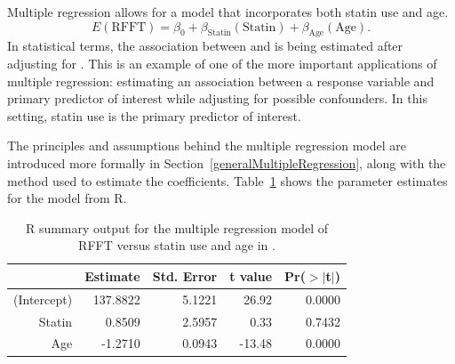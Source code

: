 Multiple regression allows for a model that incorporates both statin use and age.
 \[
    E(\text{RFFT}) = \beta_0 + \beta_{\text{Statin}}(\text{Statin}) + \beta_{\text{Age}}(\text{Age}).
	\label{RFFTStatinAgeEquation}
 \]
In statistical terms, the association between  and  is being estimated after adjusting for . This is an example of one of the more important applications of multiple regression: estimating an association between a response variable and primary predictor of interest while adjusting for possible confounders. In this setting, statin use is the primary predictor of interest.

The principles and assumptions behind the multiple regression model are introduced more formally in Section~\ref{generalMultipleRegression}, along with the method used to estimate the coefficients. Table~\ref{prevendRFFTStatinAgeRegression} shows the parameter estimates for the model from \textsf{R}. 
\begin{table}[ht]
\centering
\begin{tabular}{rrrrr}
  \hline
 & Estimate & Std. Error & t value & Pr($>$$|$t$|$) \\ 
  \hline
(Intercept) & 137.8822 & 5.1221 & 26.92 & 0.0000 \\ 
  Statin & 0.8509 & 2.5957 & 0.33 & 0.7432 \\ 
  Age & -1.2710 & 0.0943 & -13.48 & 0.0000 \\ 
   \hline
\end{tabular}
\caption{\textsf{R} summary output for the multiple regression model of RFFT versus statin use and age in .} 
\label{prevendRFFTStatinAgeRegression}
\end{table}
 
